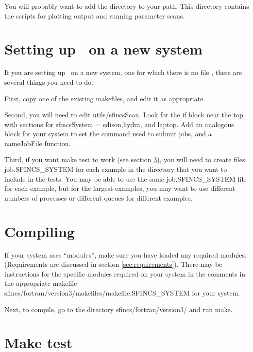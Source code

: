 You will probably want to add the directory  to your
path.  This directory contains the scripts for plotting output and running parameter scans.

\section{Setting up \sfincs~on a new system}
If you are setting up \sfincs~on a new system, one for which there is no file
,
there are several things you need to do.

First, copy one of the existing makefiles, and edit it as appropriate.

Second, you will need to edit {\ttfamily utils/sfincsScan}. Look for the {\ttfamily if} block near the top
with sections for {\ttfamily sfincsSystem = edison},{\ttfamily hydra}, and {\ttfamily laptop}. Add an analogous block
for your system to set the command used to submit jobs, and a {\ttfamily nameJobFile} function.

Third, if you want {\ttfamily make test} to work (see section \ref{sec:maketest}),
you will need to create files {\ttfamily job.SFINCS\_SYSTEM}
for each example in the  directory that you want to include
in the tests.  You may be able to use the same {\ttfamily job.SFINCS\_SYSTEM} file for each example, but for the largest examples,
you may want to use different numbers of processes or different queues for different examples.

\section{Compiling}

If your system uses ``modules'', make sure you have loaded any required modules.
(Requirements are discussed in section \ref{sec:requirements}).  
There may be
instructions for the specific modules required on your system in the comments in the
appropriate makefile \\{\ttfamily sfincs/fortran/version3/makefiles/makefile.SFINCS\_SYSTEM} for your system.

Next, to compile, go to the directory {\ttfamily sfincs/fortran/version3/} and run {\ttfamily make}.

\section{Make test}
\label{sec:maketest}

